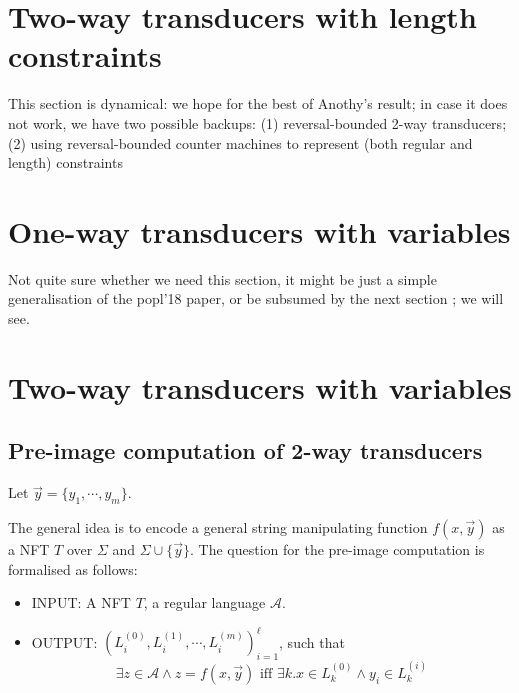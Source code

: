 \documentclass{llncs}
\begin{document}



\section{Two-way transducers with length constraints}

This section is dynamical: we hope for the best of Anothy's result; in case it does not work, we have two possible backups: (1) reversal-bounded 2-way transducers; (2) using reversal-bounded counter machines to represent (both regular and length) constraints


\section{One-way transducers with variables}

Not quite sure whether we need this section, it might be just a simple generalisation of the popl'18 paper, or be subsumed by the next section ; we will see.


\section{Two-way transducers with variables}

\subsection{Pre-image computation of 2-way transducers}

Let $\vec{y}=\{y_1, \cdots, y_m\}$.

The general idea is to encode a general string manipulating function $f(x, \vec{y})$ as a NFT $T$ over $\Sigma$ and $\Sigma\cup\{\vec{y}\}$. The question for the pre-image computation is formalised as follows:
\begin{itemize}
	\item INPUT: A NFT $T$, a regular language $\mathcal{A}$.
	\item OUTPUT: $(L^{(0)}_i, L^{(1)}_i, \cdots, L^{(m)}_i )_{i=1}^\ell$, such that
	\[\exists z\in\mathcal{A} \wedge z=f(x, \vec{y})\mbox{ iff }\exists k. x\in L^{(0)}_k \wedge y_i\in L^{(i)}_k \]
\end{itemize}
\end{document}
